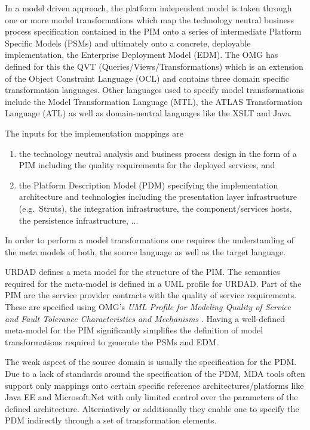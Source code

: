 In a model driven approach, the platform independent model is taken through one or
more model transformations which map the technology neutral business process specification
contained in the PIM onto a series of intermediate Platform Specific Models (PSMs)
and ultimately onto a concrete, deployable implementation, the Enterprise Deployment Model (EDM).
The OMG has defined for this the QVT (Queries/Views/Transformations) \cite{omg:qvt}
which is an extension of the Object Constraint Language (OCL) and contains three domain
specific transformation languages. Other languages used to specify model transformations include
the Model Transformation Language (MTL), the ATLAS Transformation Language (ATL) as well as domain-neutral
languages like the XSLT and Java.

The inputs for the implementation mappings are
\begin{enumerate}
  \item the technology neutral analysis and business process design in the form of a PIM including
			the quality requirements for the deployed services, and
  \item the Platform Description Model (PDM) specifying the implementation architecture
			and technologies including the presentation layer infrastructure (e.g.\ Struts),
			the integration infrastructure, the component/services hosts, the persistence
			infrastructure, ...
\end{enumerate}
In order to perform a model transformations one requires the understanding of the meta models of both,
the source language as well as the target language.

URDAD defines a meta model for the
structure of the PIM. The semantics required for the meta-model is defined in a UML profile for URDAD.
Part of the PIM are the service provider contracts with the quality of service requirements. These are
specified using OMG's {\em UML Profile for Modeling Quality of Service and Fault Tolerance Characteristics
and Mechanisms} \cite{omg:umlProfileQos}. Having a well-defined meta-model for the PIM significantly
simplifies the definition of model transformations required to generate the PSMs and EDM.

The weak aspect of the source domain is usually the specification for the PDM.
Due to a lack of standards around the specification of the PDM, MDA tools often support only
mappings onto certain specific reference architectures/platforms like Java EE and Microsoft.Net
with only limited control over the parameters of the defined architecture. Alternatively
or additionally they enable one to specify the PDM indirectly through a set of transformation
elements.

